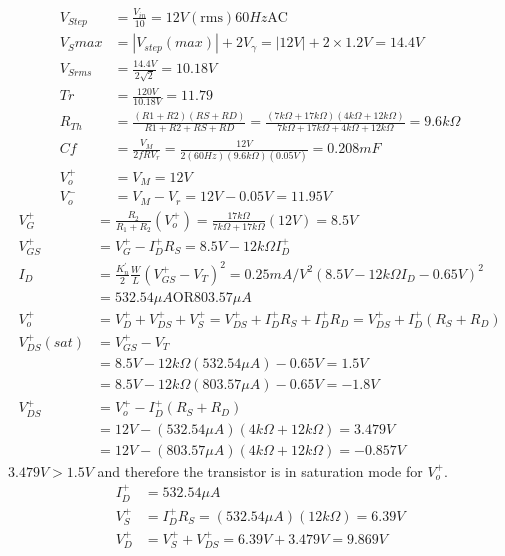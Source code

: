 \documentclass[12pt,letterpaper,titlepage]{article}
\begin{document}
\begin{raggedright}
\begin{align*}
   V_{Step}
   &= \frac{V_{in}}{10}
    = 12V(\text{rms}) 60Hz \text{AC} 
\\ V_S{max} 
   &= |V_{step}(max)| + 2V_\gamma
    = |12V| + 2 \times 1.2V
    = 14.4V
\\ V_{Srms}
   &= \frac{14.4V}{2\sqrt{2}}
	= 10.18V
\\ Tr
   &= \frac{120V}{10.18V}
	= 11.79
\\ R_{Th}
   &= \frac{(R1+R2)(RS+RD)}{R1+R2+RS+RD}
	= \frac{(7k\Omega + 17k\Omega)(4k\Omega + 12k\Omega)}{7k\Omega + 17k\Omega+4k\Omega + 12k\Omega}
	= 9.6k\Omega
\\ Cf
   &= \frac{V_M}{2fRV_r}
    = \frac{12V}{2(60Hz)(9.6k\Omega)(0.05V)}
    = 0.208mF
\\ V_o^+
   &= V_M
    = 12V
\\ V_o^-
   &= V_M - V_r
    = 12V - 0.05V
    = 11.95V
\end{align*}
\begin{align*}
   V_G^+
    &= \frac{R_2}{R_1 + R_2}(V_o^+)
     = \frac{17k\Omega}{7k\Omega+17k\Omega}(12V)
     = 8.5V
\\ V_{GS}^+
    &= V_G^+ - I_D^+R_S
     = 8.5V - 12k\Omega I_D^+
\\ I_D
	&= \frac{K_n^\prime}{2}\frac{W}{L} (V_{GS}^+ - V_{T})^2
	 = 0.25 mA/V^2 (8.5V - 12k\Omega I_D - 0.65V)^2
\\	&= 532.54\mu A \text{OR} 803.57\mu A
\\ V_o^+
	&= V_D^+ + V_{DS}^+ + V_{S}^+
	 = V_{DS}^+ + I_D^+R_S + I_D^+R_D
	 = V_{DS}^+ + I_D^+(R_S + R_D)
\\ V_{DS}^+(sat)
	&= V_{GS}^+ - V_T
\\	&= 8.5V - 12k\Omega (532.54\mu A) - 0.65V
	 = 1.5V
\\	&= 8.5V - 12k\Omega (803.57\mu A) - 0.65V
	 = -1.8V
\\ V_{DS}^+
	&= V_o^+ - I_D^+(R_S + R_D)
\\  &= 12V - (532.54\mu A)(4k\Omega + 12k\Omega)
	 = 3.479V
\\  &= 12V - (803.57\mu A)(4k\Omega + 12k\Omega)
	 = -0.857V
\end{align*}
$3.479V > 1.5V$ and therefore the transistor is in saturation mode for $V_o^+$.
\begin{align*}
   I_D^+
   &= 532.54\mu A
\\ V_S^+
   &= I_D^+R_S
    = (532.54\mu A)(12k\Omega)
    = 6.39V
\\ V_D^+
   &= V_S^+ + V_{DS}^+
    = 6.39V + 3.479V
    = 9.869V

\end{align*}
\end{raggedright}
\end{document}
